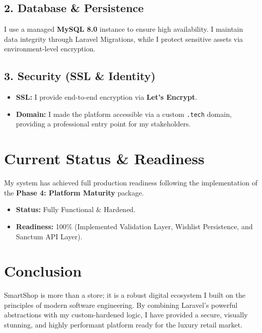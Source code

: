 \documentclass[12pt,a4paper]{article}
\begin{document}
\subsection{2. Database \& Persistence}
I use a managed \textbf{MySQL 8.0} instance to ensure high availability. I maintain data integrity through Laravel Migrations, while I protect sensitive assets via environment-level encryption.

\subsection{3. Security (SSL \& Identity)}
\begin{itemize}
    \item \textbf{SSL:} I provide end-to-end encryption via \textbf{Let's Encrypt}.
    \item \textbf{Domain:} I made the platform accessible via a custom \texttt{.tech} domain, providing a professional entry point for my stakeholders.
\end{itemize}

\section{Current Status \& Readiness}

My system has achieved full production readiness following the implementation of the \textbf{Phase 4: Platform Maturity} package.
\begin{itemize}
    \item \textbf{Status:} Fully Functional \& Hardened.
    \item \textbf{Readiness:} 100\% (Implemented Validation Layer, Wishlist Persistence, and Sanctum API Layer).
\end{itemize}

\section{Conclusion}

SmartShop is more than a store; it is a robust digital ecosystem I built on the principles of modern software engineering. By combining Laravel's powerful abstractions with my custom-hardened logic, I have provided a secure, visually stunning, and highly performant platform ready for the luxury retail market.
\end{document}
